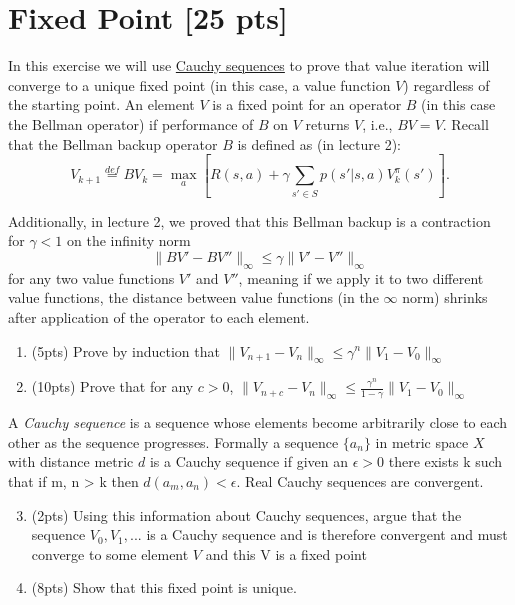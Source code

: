 \section{Fixed Point [25 pts]}

In this exercise we will use  \href{https://en.wikipedia.org/wiki/Cauchy_sequence}{Cauchy sequences}  to prove that value iteration will converge to a unique fixed point (in this case, a value function $V$) regardless of the starting point. An element $V$ is a fixed point for an operator $B$ (in this case the Bellman operator) if performance of $B$ on $V$ returns $V$, i.e., $BV = V$. Recall that the Bellman backup operator $B$ is defined as (in lecture 2):
\begin{equation}
    V_{k+1} \overset{def}{=} BV_{k} = \max_a[ R(s, a) + \gamma\sum_{s' \in S}p(s'|s,a)V^\pi_{k}(s')].
\end{equation}

Additionally, in lecture 2, we proved that this Bellman backup is a contraction for $\gamma < 1$ on the infinity norm
\begin{equation}
    \|BV' - BV''\|_\infty\leq \gamma \|V' - V''\|_\infty
\end{equation}
for any two value functions $V'$ and $V''$, meaning if we apply it to two different value functions, the distance between value functions (in the $\infty$ norm) shrinks after application of the operator to each element.

\begin{enumerate}[label=(\alph*)]
\item (5pts) Prove by induction that $\|V_{n+1} - V_{n}\|_\infty \leq \gamma^n \|V_1 - V_0\|_\infty$


\item (10pts) Prove that for any $c>0$, $\|V_{n+c} - V_n\|_\infty \leq \frac{\gamma^n}{1-\gamma}\|V_1 - V_0\|_\infty$
\end{enumerate}


A \emph{Cauchy sequence} is a sequence whose elements become arbitrarily close to each other as the sequence progresses. Formally a sequence $\{a_n\}$ in metric space $X$ with distance metric $d$ is a Cauchy sequence if given an $\epsilon > 0$ there exists k such that if m, n > k then $d(a_m, a_n) < \epsilon$. Real Cauchy sequences are convergent.
\begin{enumerate}[label=(\alph*)]
\setcounter{enumi}{2}
\item (2pts) Using this information about Cauchy sequences, argue that the sequence $V_0, V_1, ...$ is a Cauchy sequence and is therefore convergent and must converge to some element $V$ and this V is a fixed point

\item (8pts) Show that this fixed point is unique. 


\end{enumerate}